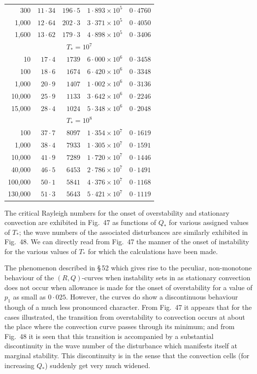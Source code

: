 \begin{table}[htbp]
{\begin{tabular}{@{}r r r r r@{}}
300 & $11{\cdot}34$ & $196{\cdot}5$ & $1{\cdot}893\times10^5$ & $0{\cdot}4760$ \\
1{,}000 & $12{\cdot}64$ & $202{\cdot}3$ & $3{\cdot}371\times10^5$ & $0{\cdot}4050$ \\
1{,}600 & $13{\cdot}62$ & $179{\cdot}3$ & $4{\cdot}898\times10^5$ & $0{\cdot}3406$ \\[6pt]
\multicolumn{5}{c}{$T_* = 10^7$} \\[3pt]
10 & $17{\cdot}4$ & $1739$ & $6{\cdot}000\times10^6$ & $0{\cdot}3458$ \\
100 & $18{\cdot}6$ & $1674$ & $6{\cdot}420\times10^6$ & $0{\cdot}3348$ \\
1{,}000 & $20{\cdot}9$ & $1407$ & $1{\cdot}002\times10^6$ & $0{\cdot}3136$ \\
10{,}000 & $25{\cdot}9$ & $1133$ & $3{\cdot}642\times10^6$ & $0{\cdot}2246$ \\
15{,}000 & $28{\cdot}4$ & $1024$ & $5{\cdot}348\times10^6$ & $0{\cdot}2048$ \\[6pt]
\multicolumn{5}{c}{$T_* = 10^8$} \\[3pt]
100 & $37{\cdot}7$ & $8097$ & $1{\cdot}354\times10^7$ & $0{\cdot}1619$ \\
1{,}000 & $38{\cdot}4$ & $7933$ & $1{\cdot}305\times10^7$ & $0{\cdot}1591$ \\
10{,}000 & $41{\cdot}9$ & $7289$ & $1{\cdot}720\times10^7$ & $0{\cdot}1446$ \\
40{,}000 & $46{\cdot}5$ & $6453$ & $2{\cdot}786\times10^7$ & $0{\cdot}1491$ \\
100{,}000 & $50{\cdot}1$ & $5841$ & $4{\cdot}376\times10^7$ & $0{\cdot}1168$ \\
130{,}000 & $51{\cdot}3$ & $5643$ & $5{\cdot}421\times10^7$ & $0{\cdot}1119$ \\
\hline
\end{tabular}
}
\end{table}

The critical Rayleigh numbers for the onset of overstability and
stationary convection are exhibited in Fig.~47 as functions of $Q_*$ for
various assigned values of $T_*$; the wave numbers of the associated disturbances are similarly exhibited in Fig.~48. We can directly read from
Fig.~47 the manner of the onset of instability for the various values of
$T_*$ for which the calculations have been made.

The phenomenon described in \S\,52 which gives rise to the peculiar,
non-monotone behaviour of the $(R, Q)$-curves when instability sets in
as stationary convection does not occur when allowance is made for the
onset of overstability for a value of $p_1$ as small as $0{\cdot}025$. However, the
curves do show a discontinuous behaviour though of a much less pro\-nounced character. From Fig.~47 it appears that for the cases illustrated,
the transition from overstability to convection occurs at about the place
where the convection curve passes through its minimum; and from Fig.~48 it is seen that this transition is accompanied by a substantial dis\-continuity in the wave number of the disturbance which manifests itself
at marginal stability. This discontinuity is in the sense that the convection cells (for increasing $Q_*$) suddenly get very much widened.

